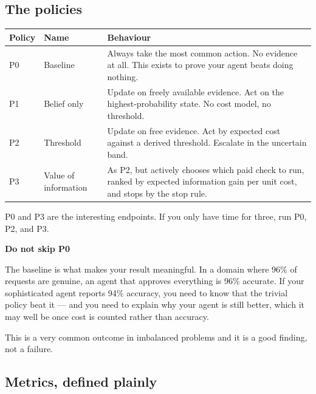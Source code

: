 \documentclass[11pt,a4paper]{article}
\newcommand{\boxtitle}[1]{{\bfseries #1}\par\vspace{2pt}}
\begin{document}
\subsection{The policies}

\begin{center}
\begin{tabular}{@{}L{2.2cm}L{4.0cm}L{8.4cm}@{}}
\toprule
\textbf{Policy} & \textbf{Name} & \textbf{Behaviour} \\
\midrule
P0 & Baseline & Always take the most common action. No evidence at all. This exists to prove your agent beats doing nothing. \\
P1 & Belief only & Update on freely available evidence. Act on the highest-probability state. No cost model, no threshold. \\
P2 & Threshold & Update on free evidence. Act by expected cost against a derived threshold. Escalate in the uncertain band. \\
P3 & Value of information & As P2, but actively chooses which paid check to run, ranked by expected information gain per unit cost, and stops by the stop rule. \\
\bottomrule
\end{tabular}
\end{center}

P0 and P3 are the interesting endpoints. If you only have time for three, run P0, P2, and P3.

\begin{sbbox}
\boxtitle{Do not skip P0}
The baseline is what makes your result meaningful. In a domain where 96\% of requests are
genuine, an agent that approves everything is 96\% accurate. If your sophisticated agent reports
94\% accuracy, you need to know that the trivial policy beat it --- and you need to explain why
your agent is still better, which it may well be once cost is counted rather than accuracy.

This is a very common outcome in imbalanced problems and it is a good finding, not a failure.
\end{sbbox}

\subsection{Metrics, defined plainly}
\end{document}
